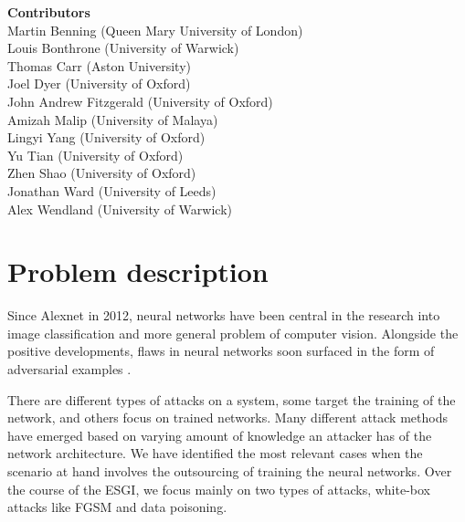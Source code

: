 \documentclass[12pt]{article}
\begin{document}
\begin{center}
    \large\textbf{Contributors}\\
    \vskip1cm
    \normalsize Martin Benning (Queen Mary University of London)\\
    \normalsize Louis Bonthrone (University of Warwick)\\
    \normalsize Thomas Carr (Aston University)\\
    \normalsize Joel Dyer (University of Oxford)\\
    \normalsize John Andrew Fitzgerald (University of Oxford)\\
    \normalsize Amizah Malip (University of Malaya)\\
    \normalsize Lingyi Yang (University of Oxford)\\
    \normalsize Yu Tian (University of Oxford)\\
    \normalsize Zhen Shao (University of Oxford)\\
    \normalsize Jonathan Ward (University of Leeds)\\
    \normalsize Alex Wendland (University of Warwick)
\end{center}
\newpage

\tableofcontents
\newpage




\section{Problem description}
Since Alexnet in 2012, neural networks have been central in the research into image classification and more general problem of computer vision. Alongside the positive developments, flaws in neural networks soon surfaced in the form of adversarial examples \cite{Szegedy13}.

There are different types of attacks on a system, some target the training of the network, and others focus on trained networks. Many different attack methods have emerged based on varying amount of knowledge an attacker has of the network architecture. We have identified the most relevant cases when the scenario at hand involves the outsourcing of training the neural networks. Over the course of the ESGI, we focus mainly on two types of attacks, white-box attacks like FGSM and data poisoning.
\end{document}
